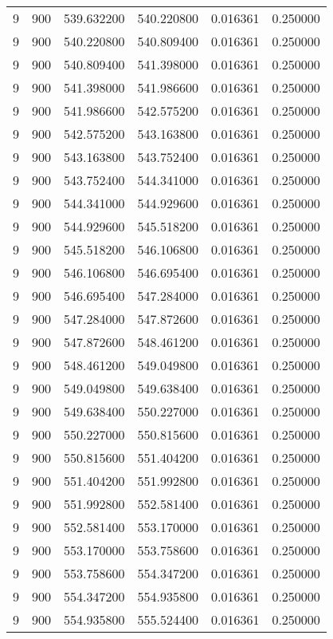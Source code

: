 \begin{longtable}{rrrrrr}
9 & 900 & 539.632200 & 540.220800 & 0.016361 & 0.250000 \\
9 & 900 & 540.220800 & 540.809400 & 0.016361 & 0.250000 \\
9 & 900 & 540.809400 & 541.398000 & 0.016361 & 0.250000 \\
9 & 900 & 541.398000 & 541.986600 & 0.016361 & 0.250000 \\
9 & 900 & 541.986600 & 542.575200 & 0.016361 & 0.250000 \\
9 & 900 & 542.575200 & 543.163800 & 0.016361 & 0.250000 \\
9 & 900 & 543.163800 & 543.752400 & 0.016361 & 0.250000 \\
9 & 900 & 543.752400 & 544.341000 & 0.016361 & 0.250000 \\
9 & 900 & 544.341000 & 544.929600 & 0.016361 & 0.250000 \\
9 & 900 & 544.929600 & 545.518200 & 0.016361 & 0.250000 \\
9 & 900 & 545.518200 & 546.106800 & 0.016361 & 0.250000 \\
9 & 900 & 546.106800 & 546.695400 & 0.016361 & 0.250000 \\
9 & 900 & 546.695400 & 547.284000 & 0.016361 & 0.250000 \\
9 & 900 & 547.284000 & 547.872600 & 0.016361 & 0.250000 \\
9 & 900 & 547.872600 & 548.461200 & 0.016361 & 0.250000 \\
9 & 900 & 548.461200 & 549.049800 & 0.016361 & 0.250000 \\
9 & 900 & 549.049800 & 549.638400 & 0.016361 & 0.250000 \\
9 & 900 & 549.638400 & 550.227000 & 0.016361 & 0.250000 \\
9 & 900 & 550.227000 & 550.815600 & 0.016361 & 0.250000 \\
9 & 900 & 550.815600 & 551.404200 & 0.016361 & 0.250000 \\
9 & 900 & 551.404200 & 551.992800 & 0.016361 & 0.250000 \\
9 & 900 & 551.992800 & 552.581400 & 0.016361 & 0.250000 \\
9 & 900 & 552.581400 & 553.170000 & 0.016361 & 0.250000 \\
9 & 900 & 553.170000 & 553.758600 & 0.016361 & 0.250000 \\
9 & 900 & 553.758600 & 554.347200 & 0.016361 & 0.250000 \\
9 & 900 & 554.347200 & 554.935800 & 0.016361 & 0.250000 \\
9 & 900 & 554.935800 & 555.524400 & 0.016361 & 0.250000 \\

\end{longtable}
